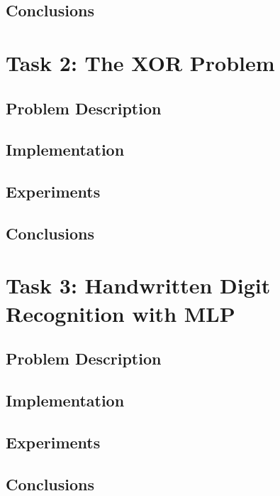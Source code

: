 \documentclass{article}
\begin{document}


\subsection{Conclusions}

\newpage
\section{Task 2: The XOR Problem}
\subsection{Problem Description}

\subsection{Implementation}

\subsection{Experiments}

\subsection{Conclusions}

\newpage
\section{Task 3: Handwritten Digit Recognition with MLP}
\subsection{Problem Description}

\subsection{Implementation}

\subsection{Experiments}

\subsection{Conclusions}
\end{document}
